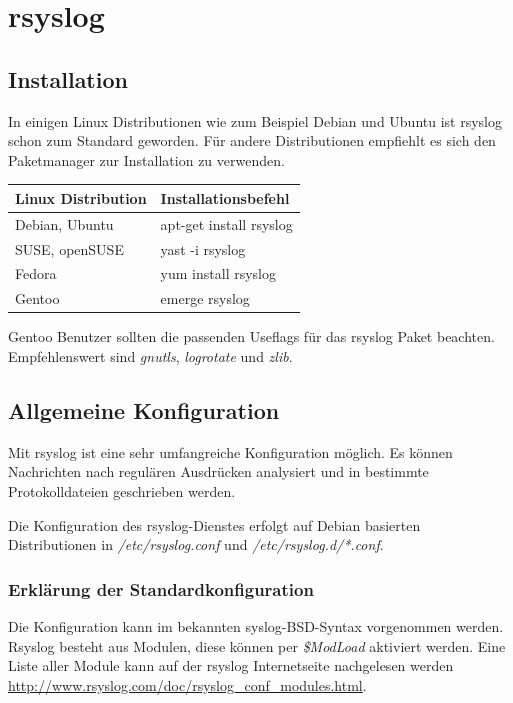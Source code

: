 \section{rsyslog}
\subsection{Installation}
In einigen Linux Distributionen wie zum Beispiel Debian und Ubuntu ist rsyslog schon zum Standard geworden. Für andere Distributionen empfiehlt es sich den Paketmanager zur Installation zu verwenden.

\begin{tabular}{ll}
	\hline
	Linux Distribution & Installationsbefehl\\
	\hline\hline
	Debian, Ubuntu & apt-get install rsyslog\\
	SUSE, openSUSE & yast -i rsyslog\\
	Fedora         & yum install rsyslog\\
	Gentoo         & emerge rsyslog
\end{tabular}

\begin{informationnote}
	Gentoo Benutzer sollten die passenden Useflags für das rsyslog Paket beachten. Empfehlenswert sind
	\textit{gnutls}, \textit{logrotate} und \textit{zlib}. 
\end{informationnote}

\subsection{Allgemeine Konfiguration}
Mit rsyslog ist eine sehr umfangreiche Konfiguration möglich. Es können Nachrichten nach regulären Ausdrücken analysiert und in bestimmte Protokolldateien geschrieben werden.

Die Konfiguration des rsyslog-Dienstes erfolgt auf Debian basierten Distributionen in \textit{/etc/rsyslog.conf} und \textit{/etc/rsyslog.d/*.conf}.

\subsubsection{Erklärung der Standardkonfiguration}
Die Konfiguration kann im bekannten syslog-BSD-Syntax vorgenommen werden. Rsyslog besteht aus Modulen, diese können per \textit{\$ModLoad} aktiviert werden. Eine Liste aller Module kann auf der rsyslog Internetseite nachgelesen werden \url{http://www.rsyslog.com/doc/rsyslog_conf_modules.html}.

